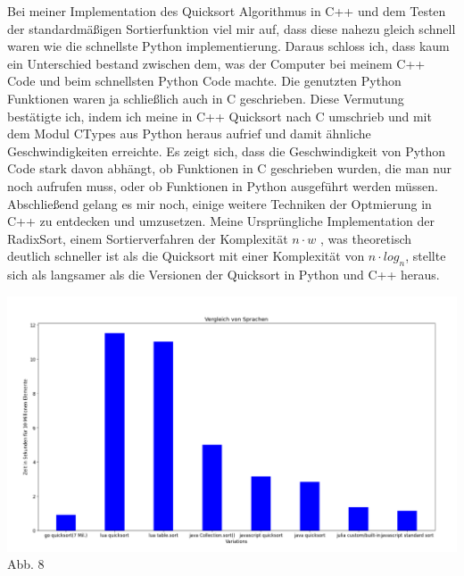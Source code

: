 \documentclass[12pt,a4paper]{article}
\begin{document}
Bei meiner Implementation des Quicksort Algorithmus in C++ und dem Testen der standardmäßigen Sortierfunktion
viel mir auf, dass diese nahezu gleich schnell waren wie die schnellste Python implementierung.
Daraus schloss ich, dass kaum ein Unterschied bestand zwischen dem, was der Computer bei meinem C++ Code und beim schnellsten Python Code machte.
Die genutzten Python Funktionen waren ja schließlich auch in C geschrieben. Diese Vermutung bestätigte ich, indem
ich meine in C++ Quicksort nach C umschrieb und mit dem Modul CTypes aus Python heraus aufrief und damit ähnliche Geschwindigkeiten
erreichte. Es zeigt sich, dass die Geschwindigkeit von Python Code stark davon abhängt, ob Funktionen in C geschrieben wurden,
die man nur noch aufrufen muss, oder ob Funktionen in Python ausgeführt werden müssen.
Abschließend gelang es mir noch, einige weitere Techniken der Optmierung in C++ zu entdecken und umzusetzen.
Meine Ursprüngliche Implementation der RadixSort, einem Sortierverfahren der Komplexität $n \cdot w$ , was theoretisch deutlich schneller ist als die Quicksort
mit einer Komplexität von $n \cdot log_{n}$, stellte sich als langsamer als die Versionen  der Quicksort in Python und C++ heraus.


\begin{center}
    \hspace*{-3cm}\includegraphics[width=1.4\textwidth]{./diagramme/matplotlib/comparison.png}
    Abb. 8
\end{center}
\end{document}
